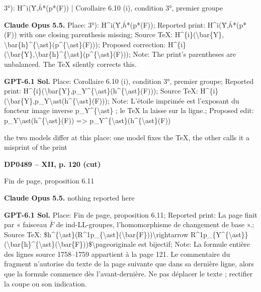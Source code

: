 3°): H\textasciicircum{}i(Ȳ,\ensuremath{\bar{h}}*(p*(F)) | Corollaire 6.10 (i), condition 3°, premier groupe\par
\textbf{Claude Opus 5.5.} Place: 3°): H\textasciicircum{}i(Ȳ,\ensuremath{\bar{h}}*(p*(F)); Reported print: H\textasciicircum{}i(Ȳ,\ensuremath{\bar{h}}*(p*(F)) with one closing parenthesis missing; Source TeX: H\textasciicircum{}\{i\}(\textbackslash{}bar\{Y\}, \textbackslash{}bar\{h\}\textasciicircum{}\{\textbackslash{}ast\}(p\textasciicircum{}\{\textbackslash{}ast\}(F))); Proposed correction: H\textasciicircum{}\{i\}(\textbackslash{}bar\{Y\},\textbackslash{}bar\{h\}\textasciicircum{}\{\textbackslash{}ast\}(p\textasciicircum{}\{\textbackslash{}ast\}(F))); Note: The print's parentheses are unbalanced. The TeX silently corrects this.\par
\textbf{GPT-6.1 Sol.} Place: Corollaire 6.10 (i), condition 3°, premier groupe; Reported print: H\textasciicircum{}\{i\}(\textbackslash{}bar\{Y\},p\_Y\textasciicircum{}\{\textbackslash{}ast\}(h\textasciicircum{}\{\textbackslash{}ast\}(F))); Source TeX: H\textasciicircum{}\{i\}(\textbackslash{}bar\{Y\},p\_Y\textbackslash{}ast(h\textasciicircum{}\{\textbackslash{}ast\}(F))); Note: L'étoile imprimée est l'exposant du foncteur image inverse p\_Y\textasciicircum{}\{\textbackslash{}ast\} ; le TeX la laisse sur la ligne.; Proposed edit: p\_Y\textbackslash{}ast(h\textasciicircum{}\{\textbackslash{}ast\}(F)) =\allowbreak > p\_Y\textasciicircum{}\{\textbackslash{}ast\}(h\textasciicircum{}\{\textbackslash{}ast\}(F))\par
the two models differ at this place: one model fixes the TeX, the other calls it a misprint of the print\par
\par\noindent\hypertarget{DP0489}{}\textbf{DP0489 -- XII, p. 120 (cut)}\par
Fin de page, proposition 6.11\par
\textbf{Claude Opus 5.5.} nothing reported here\par
\textbf{GPT-6.1 Sol.} Place: Fin de page, proposition 6.11; Reported print: La page finit par « faisceau \ensuremath{\bar{F}} de ind-LL-groupes, l'homomorphisme de changement de base ».; Source TeX: \$h\textasciicircum{}\{\textbackslash{}ast\}(R\textasciicircum{}1p\_\{\textbackslash{}ast\}(\textbackslash{}bar\{F\}))\textbackslash{}rightarrow R\textasciicircum{}1p\_\{Y\textasciicircum{}\{\textbackslash{}ast\}\}(\textbackslash{}bar\{h\}\textasciicircum{}\{\textbackslash{}ast\}(\textbackslash{}bar\{F\}))\$\textbackslash{}pageoriginale est bijectif; Note: La formule entière des lignes source 1758–1759 appartient à la page 121. Le commentaire du fragment n'autorise du texte de la page suivante que dans sa dernière ligne, alors que la formule commence dès l'avant-dernière. Ne pas déplacer le texte ; rectifier la coupe ou son indication.\par
